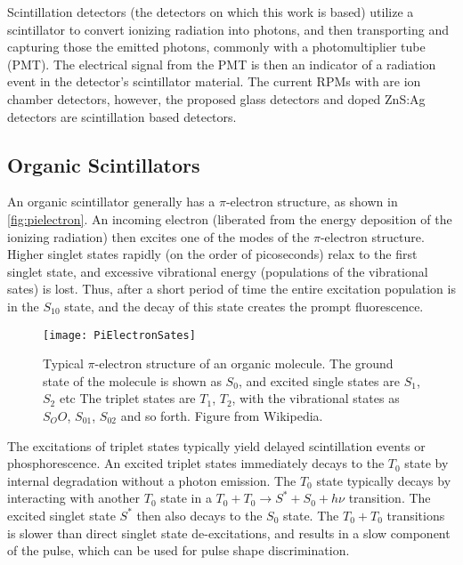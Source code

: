 Scintillation detectors (the detectors on which this work is based) utilize a scintillator to convert ionizing radiation into photons, and then transporting and capturing those the emitted photons, commonly with a photomultiplier tube (PMT).
The electrical signal from the PMT is then an indicator of a radiation event in the detector's scintillator material.
The current RPMs with  are ion chamber detectors, however, the proposed  glass detectors and  doped ZnS:Ag detectors are scintillation based detectors. 

\subsection{Organic Scintillators}
An organic scintillator generally has a $\pi$-electron structure, as shown in \autoref{fig:pielectron}.
An incoming electron (liberated from the energy deposition of the ionizing radiation) then excites one of the modes of the $\pi$-electron structure.
Higher singlet states rapidly (on the order of picoseconds) relax to the first singlet state, and excessive vibrational energy (populations of the vibrational sates) is lost.
Thus, after a short period of time the entire excitation population is in the $S_10$ state, and the decay of this state creates the prompt fluorescence.
\begin{figure}
  \centering
  \texttt{[image: PiElectronSates]}
  \caption[$\pi$ Electron Structure]{Typical $\pi$-electron structure of an organic molecule. The ground state of the molecule is shown as $S_0$, and excited single states are $S_1$, $S_2$ etc The triplet states are $T_1$, $T_2$, with the vibrational states as $S_OO$, $S_01$, $S_02$ and so forth. Figure from Wikipedia.}
  \label{fig:pielectron}
\end{figure}
The excitations of triplet states typically yield delayed scintillation events or phosphorescence.
An excited triplet states immediately decays to the $T_0$ state by internal degradation without a photon emission.
The $T_0$ state typically decays by interacting with another $T_0$ state in a $T_0 + T_0 \to S^* + S_0 + h\nu$ transition.
The excited singlet state $S^*$ then also decays to the $S_0$ state.
The $T_0 + T_0$ transitions is slower than direct singlet state de-excitations, and results in a slow component of the pulse, which can be used for pulse shape discrimination.

